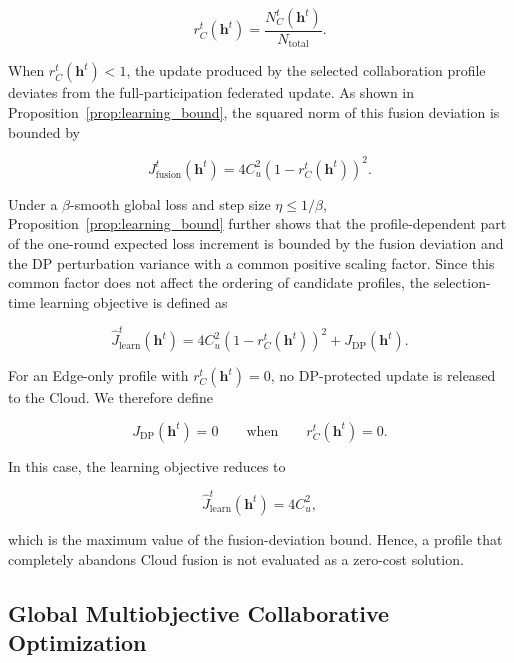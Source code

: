 \documentclass[5p,times]{elsarticle}
\theoremstyle{plain}
\theoremstyle{definition}
\theoremstyle{remark}
\begin{document}
\begin{equation}
r_C^t(\mathbf h^t)
=
\frac{
N_C^t(\mathbf h^t)
}{
N_{\mathrm{total}}
}.
\label{eq:cloud_mass_ratio}
\end{equation}

When \(r_C^t(\mathbf h^t)<1\), the update produced by the selected
collaboration profile deviates from the full-participation federated update.
As shown in Proposition~\ref{prop:learning_bound}, the squared norm of this
fusion deviation is bounded by

\begin{equation}
J_{\mathrm{fusion}}^t(\mathbf h^t)
=
4C_u^2
\left(
1-r_C^t(\mathbf h^t)
\right)^2 .
\label{eq:fusion_cost}
\end{equation}

Under a \(\beta\)-smooth global loss and step size
\(\eta\le 1/\beta\), Proposition~\ref{prop:learning_bound} further shows that
the profile-dependent part of the one-round expected loss increment is bounded
by the fusion deviation and the DP perturbation variance with a common
positive scaling factor. Since this common factor does not affect the ordering
of candidate profiles, the selection-time learning objective is defined as

\begin{equation}
\widehat J_{\mathrm{learn}}^t(\mathbf h^t)
=
4C_u^2
\left(
1-r_C^t(\mathbf h^t)
\right)^2
+
J_{\mathrm{DP}}(\mathbf h^t).
\label{eq:j_learn_objective}
\end{equation}

For an Edge-only profile with
\(r_C^t(\mathbf h^t)=0\), no DP-protected update is released to the Cloud.
We therefore define

\begin{equation}
J_{\mathrm{DP}}(\mathbf h^t)=0
\qquad
\text{when}
\qquad
r_C^t(\mathbf h^t)=0 .
\label{eq:edge_only_dp_cost}
\end{equation}

In this case, the learning objective reduces to

\begin{equation}
\widehat J_{\mathrm{learn}}^t(\mathbf h^t)
=
4C_u^2 ,
\end{equation}

which is the maximum value of the fusion-deviation bound. Hence, a profile
that completely abandons Cloud fusion is not evaluated as a zero-cost
solution.

\subsection{Global Multiobjective Collaborative Optimization}
\label{sec:global_optimization}
\end{document}
